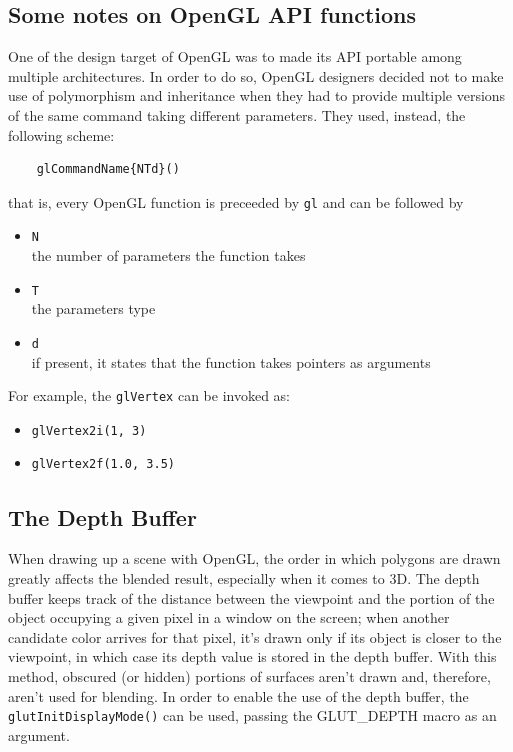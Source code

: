 \subsection{Some notes on OpenGL API functions}
One of the design target of OpenGL was to made its API portable 
among multiple architectures. In order to do so, OpenGL 
designers decided not to make use of polymorphism and inheritance 
when they had to provide multiple versions of the same command 
taking different parameters. They used, instead, the following scheme:
%
\begin{verbatim}
    glCommandName{NTd}()
\end{verbatim}
%
that is, every OpenGL function is preceeded by \texttt{gl} and can be 
followed by
%
\begin{itemize}
  \item \texttt{N} \\
    the number of parameters the function takes
  \item \texttt{T} \\
    the parameters type
  \item \texttt{d} \\
    if present, it states that the function takes pointers as arguments
\end{itemize}
%
For example, the \texttt{glVertex} can be invoked as:
\begin{itemize}
\item \texttt{glVertex2i(1, 3)}
\item \texttt{glVertex2f(1.0, 3.5)}
\end{itemize}


%
\subsection{The Depth Buffer}
When drawing up a scene with OpenGL, the order in which polygons are drawn
greatly affects the blended result, especially when it comes to 3D.
%
The depth buffer keeps track of the distance between the viewpoint and 
the portion of the object occupying a given pixel in a window on the 
screen; when another candidate color arrives for that pixel, it's drawn 
only if its object is closer to the viewpoint, in which case its depth
value is stored in the depth buffer. With this method, obscured (or hidden)
portions of surfaces aren't drawn and, therefore, aren't used for
blending.
%
In order to enable the use of the depth buffer, the 
\texttt{glutInitDisplayMode()} can be used, passing the 
GLUT\_DEPTH macro as an argument.
%

